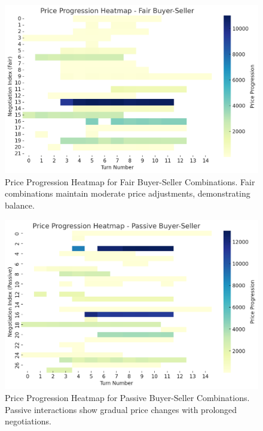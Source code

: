 \documentclass[11pt]{article}
\begin{document}
\begin{figure}[h]
    \centering
    \includegraphics[width=1\linewidth]{figures/personality/price_progression_fair.png}
    \caption{Price Progression Heatmap for Fair Buyer-Seller Combinations. Fair combinations maintain moderate price adjustments, demonstrating balance.}
    \label{fig:price_progression_fair}
\end{figure}

\begin{figure}[h]
    \centering
    \includegraphics[width=1\linewidth]{figures/personality/price_progression_passive.png}
    \caption{Price Progression Heatmap for Passive Buyer-Seller Combinations. Passive interactions show gradual price changes with prolonged negotiations.}
    \label{fig:price_progression_passive}
\end{figure}
\end{document}
